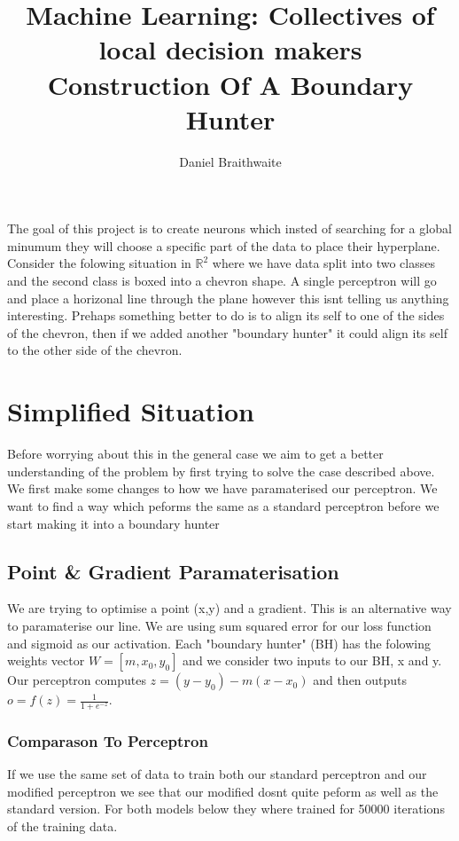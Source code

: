 \documentclass{article}
\title{%
	Machine Learning: Collectives of local decision makers\\
	\large Construction Of A Boundary Hunter
}
\author{Daniel Braithwaite}
\begin{document}
\maketitle

The goal of this project is to create neurons which insted of searching for a global minumum they will choose a specific part of the data to place their hyperplane. Consider the folowing situation in $\mathbb{R}^2$ where we have data split into two classes and the second class is boxed into a chevron shape. A single perceptron will go and place a horizonal line through the plane however this isnt telling us anything interesting. Prehaps something better to do is to align its self to one of the sides of the chevron, then if we added another "boundary hunter" it could align its self to the other side of the chevron.

\section{Simplified Situation}
Before worrying about this in the general case we aim to get a better understanding of the problem by first trying to solve the case described above. We first make some changes to how we have paramaterised our perceptron. We want to find a way which peforms the same as a standard perceptron before we start making it into a boundary hunter

\subsection{Point \& Gradient Paramaterisation}
We are trying to optimise a point (x,y) and a gradient. This is an alternative way to paramaterise our line. We are using sum squared error for our loss function and sigmoid as our activation. Each "boundary hunter" (BH) has the folowing weights vector $W = [m, x_0, y_0]$ and we consider two inputs to our BH, x and y. Our perceptron computes $z = (y - y_0) - m(x - x_0)$ and then outputs $o = f(z) = \frac{1}{1+e^{-z}}$.

\subsubsection{Comparason To Perceptron}
If we use the same set of data to train both our standard perceptron and our modified perceptron we see that our modified dosnt quite peform as well as the standard version. For both models below they where trained for 50000 iterations of the training data.
\end{document}
